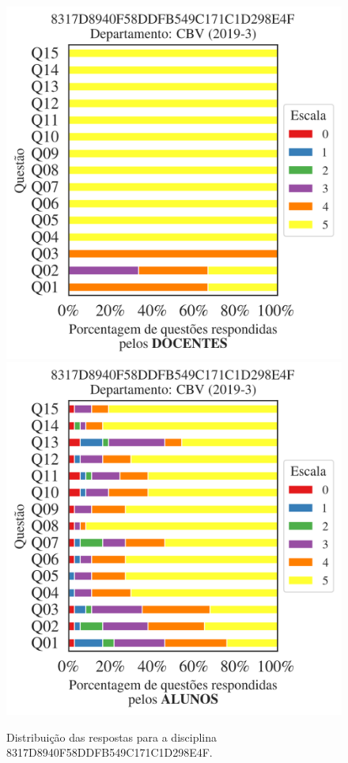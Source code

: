 \documentclass[a4paper,10pt]{article}
\begin{document}
\begin{figure}[h]
\centering
\includegraphics[width=0.485\linewidth]{analise_disciplina_departamento_CBV_8317D8940F58DDFB549C171C1D298E4F_docentes.png}
\includegraphics[width=0.485\linewidth]{analise_disciplina_departamento_CBV_8317D8940F58DDFB549C171C1D298E4F_alunos.png}
\caption{\label{fig:analise_geral_departamento}                Distribuição das respostas para a disciplina 8317D8940F58DDFB549C171C1D298E4F. }
\end{figure}
\end{document}
